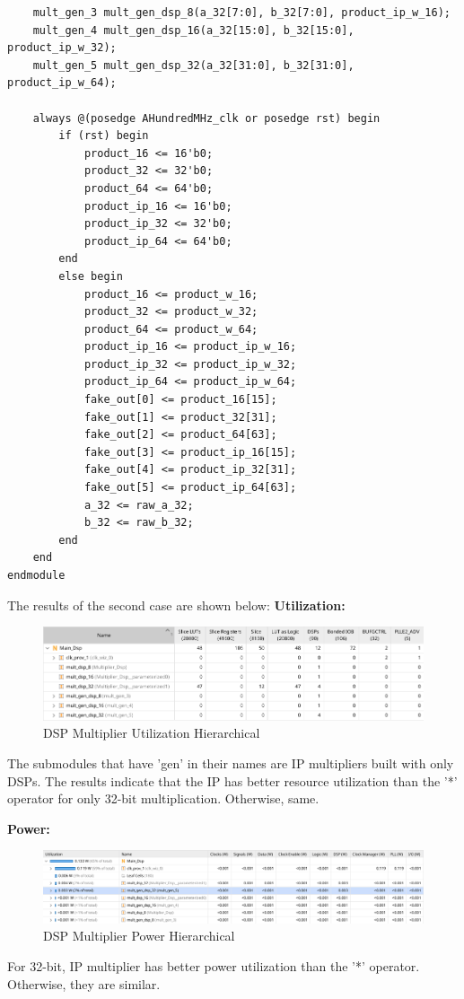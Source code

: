 \documentclass{report}
\begin{document}
\begin{verbatim}
    mult_gen_3 mult_gen_dsp_8(a_32[7:0], b_32[7:0], product_ip_w_16);
    mult_gen_4 mult_gen_dsp_16(a_32[15:0], b_32[15:0], product_ip_w_32);
    mult_gen_5 mult_gen_dsp_32(a_32[31:0], b_32[31:0], product_ip_w_64);

    always @(posedge AHundredMHz_clk or posedge rst) begin
        if (rst) begin
            product_16 <= 16'b0;
            product_32 <= 32'b0;
            product_64 <= 64'b0;
            product_ip_16 <= 16'b0;
            product_ip_32 <= 32'b0;
            product_ip_64 <= 64'b0;
        end
        else begin
            product_16 <= product_w_16;
            product_32 <= product_w_32;
            product_64 <= product_w_64;
            product_ip_16 <= product_ip_w_16;
            product_ip_32 <= product_ip_w_32;
            product_ip_64 <= product_ip_w_64;
            fake_out[0] <= product_16[15];
            fake_out[1] <= product_32[31];
            fake_out[2] <= product_64[63];
            fake_out[3] <= product_ip_16[15];
            fake_out[4] <= product_ip_32[31];
            fake_out[5] <= product_ip_64[63];
            a_32 <= raw_a_32;
            b_32 <= raw_b_32;
        end
    end
endmodule
\end{verbatim}

The results of the second case are shown below:
\textbf{Utilization:}
\begin{figure}[ht]
    \includegraphics[width=1\linewidth]{images/MUL_DSP_Util.png}
    \centering
    \caption{DSP Multiplier Utilization Hierarchical}
    \label{fig:dsp_util}
\end{figure}

The submodules that have 'gen' in their names are IP multipliers built with only DSPs. The results indicate that the IP has better resource utilization than the '*' operator for only 32-bit multiplication. Otherwise, same.


\textbf{Power:}

\begin{figure}[ht]
    \includegraphics[width=1\linewidth]{images/MUL_DSP_POWER.png}
    \centering
    \caption{DSP Multiplier Power Hierarchical}
    \label{fig:dsp_power}
\end{figure}
For 32-bit, IP multiplier has better power utilization than the '*' operator. Otherwise, they are similar.
\end{document}
